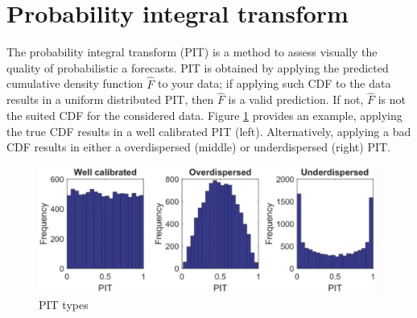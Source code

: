 \section{Probability integral transform}
The probability integral transform (PIT) is a method to assess visually the quality of probabilistic a forecasts. PIT is obtained by applying the predicted cumulative density function $\hat{F}$ to your data; if applying such CDF to the data results in a uniform distributed PIT, then $\hat{F}$ is a valid prediction. If not, $\hat{F}$ is not the suited CDF for the considered data. Figure \ref{fig:pit} provides an example, applying the true CDF results in a well calibrated PIT (left). Alternatively, applying a bad CDF results in either a overdispersed (middle) or underdispersed (right) PIT.
\begin{figure}
    \includegraphics[width=\textwidth]{images/pit.png}
    \caption{PIT types \cite{haben2023core}}
    \label{fig:pit}
  \end{figure}
\\

